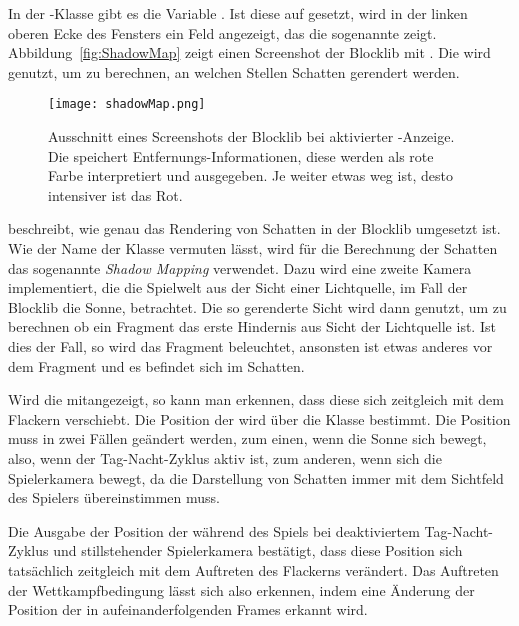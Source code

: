 In der -Klasse gibt es die Variable . Ist diese auf  gesetzt, wird in der linken oberen Ecke des Fensters ein Feld angezeigt, das die sogenannte  zeigt. Abbildung~\vref{fig:ShadowMap} zeigt einen Screenshot der Blocklib mit . Die  wird genutzt, um zu berechnen, an welchen Stellen Schatten gerendert werden.
\begin{figure}
	\centering
	\texttt{[image: shadowMap.png]}
	\caption[Ausschnitt eines Screenshots der Blocklib bei aktivierter -Anzeige.]{Ausschnitt eines Screenshots der Blocklib bei aktivierter -Anzeige. Die  speichert Entfernungs-Informationen, diese werden als rote Farbe interpretiert und ausgegeben. Je weiter etwas weg ist, desto intensiver ist das Rot.}\label{fig:ShadowMap}
\end{figure}
\textcite{Ebbinger2018} beschreibt, wie genau das Rendering von Schatten in der Blocklib umgesetzt ist. Wie der Name der Klasse  vermuten lässt, wird für die Berechnung der Schatten das sogenannte \emph{Shadow Mapping} verwendet. Dazu wird eine zweite Kamera implementiert, die die Spielwelt aus der Sicht einer Lichtquelle, im Fall der Blocklib die Sonne, betrachtet. Die so gerenderte Sicht wird dann genutzt, um zu berechnen ob ein Fragment das erste Hindernis aus Sicht der Lichtquelle ist. Ist dies der Fall, so wird das Fragment beleuchtet, ansonsten ist etwas anderes vor dem Fragment und es befindet sich im Schatten.

Wird die  mitangezeigt, so kann man erkennen, dass diese sich zeitgleich mit dem Flackern verschiebt. Die Position der  wird über die Klasse  bestimmt. Die Position muss in zwei Fällen geändert werden, zum einen, wenn die Sonne sich bewegt, also, wenn der Tag-Nacht-Zyklus aktiv ist, zum anderen, wenn sich die Spielerkamera bewegt, da die Darstellung von Schatten immer mit dem Sichtfeld des Spielers übereinstimmen muss.

Die Ausgabe der Position der  während des Spiels bei deaktiviertem Tag-Nacht-Zyklus und stillstehender Spielerkamera bestätigt, dass diese Position sich tatsächlich zeitgleich mit dem Auftreten des Flackerns verändert. Das Auftreten der Wettkampfbedingung lässt sich also erkennen, indem eine Änderung der Position der  in aufeinanderfolgenden Frames erkannt wird.

